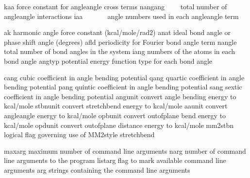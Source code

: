 \documentclass[letterpaper,11pt,english]{sphinxmanual}
\begin{document}
\begin{sphinxVerbatim}[commandchars=\\\{\}]
kaa             force constant for angle\PYGZhy{}angle cross terms
nangang         total number of angle\PYGZhy{}angle interactions
iaa             angle numbers used in each angle\PYGZhy{}angle term
\end{sphinxVerbatim}


\begin{sphinxVerbatim}[commandchars=\\\{\}]
ak              harmonic angle force constant (kcal/mole/rad\PYGZca{}2)
anat            ideal bond angle or phase shift angle (degrees)
afld            periodicity for Fourier bond angle term
nangle          total number of bond angles in the system
iang            numbers of the atoms in each bond angle
angtyp          potential energy function type for each bond angle
\end{sphinxVerbatim}


\begin{sphinxVerbatim}[commandchars=\\\{\}]
cang            cubic coefficient in angle bending potential
qang            quartic coefficient in angle bending potential
pang            quintic coefficient in angle bending potential
sang            sextic coefficient in angle bending potential
angunit         convert angle bending energy to kcal/mole
stbnunit        convert stretch\PYGZhy{}bend energy to kcal/mole
aaunit          convert angle\PYGZhy{}angle energy to kcal/mole
opbunit         convert out\PYGZhy{}of\PYGZhy{}plane bend energy to kcal/mole
opdunit         convert out\PYGZhy{}of\PYGZhy{}plane distance energy to kcal/mole
mm2stbn         logical flag governing use of MM2\PYGZhy{}style stretch\PYGZhy{}bend
\end{sphinxVerbatim}


\begin{sphinxVerbatim}[commandchars=\\\{\}]
maxarg          maximum number of command line arguments
narg            number of command line arguments to the program
listarg         flag to mark available command line arguments
arg             strings containing the command line arguments
\end{sphinxVerbatim}
\end{document}
